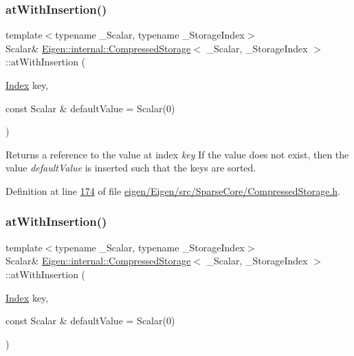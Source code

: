 \subsubsection{\texorpdfstring{at\+With\+Insertion()}{atWithInsertion()}\hspace{0.1cm}{\footnotesize\ttfamily [1/2]}}
{\footnotesize\ttfamily template$<$typename \+\_\+\+Scalar, typename \+\_\+\+Storage\+Index$>$ \\
Scalar\& \hyperlink{class_eigen_1_1internal_1_1_compressed_storage}{Eigen\+::internal\+::\+Compressed\+Storage}$<$ \+\_\+\+Scalar, \+\_\+\+Storage\+Index $>$\+::at\+With\+Insertion (\begin{DoxyParamCaption}\item[{\hyperlink{namespace_eigen_a62e77e0933482dafde8fe197d9a2cfde}{Index}}]{key,  }\item[{const Scalar \&}]{default\+Value = {\ttfamily Scalar(0)} }\end{DoxyParamCaption})\hspace{0.3cm}{\ttfamily [inline]}}

\begin{DoxyReturn}{Returns}
a reference to the value at index {\itshape key} If the value does not exist, then the value {\itshape default\+Value} is inserted such that the keys are sorted. 
\end{DoxyReturn}


Definition at line \hyperlink{eigen_2_eigen_2src_2_sparse_core_2_compressed_storage_8h_source_l00174}{174} of file \hyperlink{eigen_2_eigen_2src_2_sparse_core_2_compressed_storage_8h_source}{eigen/\+Eigen/src/\+Sparse\+Core/\+Compressed\+Storage.\+h}.

\mbox{\label{class_eigen_1_1internal_1_1_compressed_storage_a8621aa0d1d0e27b025d41b9321968357}} 
\subsubsection{\texorpdfstring{at\+With\+Insertion()}{atWithInsertion()}\hspace{0.1cm}{\footnotesize\ttfamily [2/2]}}
{\footnotesize\ttfamily template$<$typename \+\_\+\+Scalar, typename \+\_\+\+Storage\+Index$>$ \\
Scalar\& \hyperlink{class_eigen_1_1internal_1_1_compressed_storage}{Eigen\+::internal\+::\+Compressed\+Storage}$<$ \+\_\+\+Scalar, \+\_\+\+Storage\+Index $>$\+::at\+With\+Insertion (\begin{DoxyParamCaption}\item[{\hyperlink{namespace_eigen_a62e77e0933482dafde8fe197d9a2cfde}{Index}}]{key,  }\item[{const Scalar \&}]{default\+Value = {\ttfamily Scalar(0)} }\end{DoxyParamCaption})\hspace{0.3cm}{\ttfamily [inline]}}

